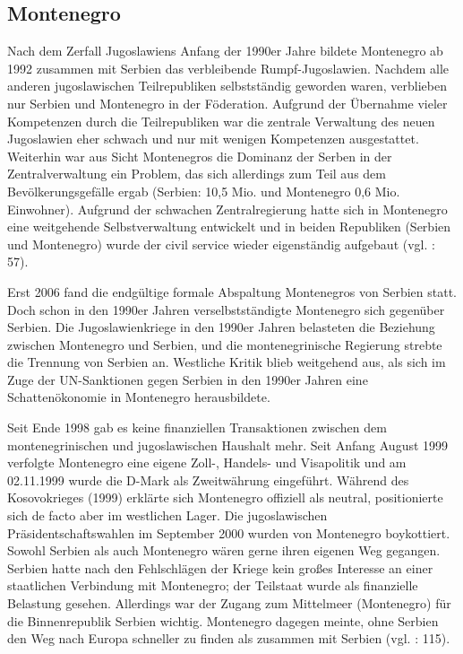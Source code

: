 \subsection{Montenegro}
Nach dem Zerfall Jugoslawiens Anfang der 1990er Jahre bildete Montenegro ab 1992 zusammen mit Serbien das verbleibende Rumpf-Jugoslawien. Nachdem alle anderen jugoslawischen Teilrepubliken selbstständig geworden waren, verblieben nur Serbien und Montenegro in der Föderation. Aufgrund der Übernahme vieler Kompetenzen durch die Teilrepubliken war die zentrale Verwaltung des neuen Jugoslawien eher schwach und nur mit wenigen Kompetenzen ausgestattet. Weiterhin war aus Sicht Montenegros die Dominanz der Serben in der Zentralverwaltung ein Problem, das sich allerdings zum Teil aus dem Bevölkerungsgefälle ergab (Serbien: 10,5 Mio. und Montenegro 0,6 Mio. Einwohner). Aufgrund der schwachen Zentralregierung hatte sich in Montenegro eine weitgehende Selbstverwaltung entwickelt und in beiden Republiken (Serbien und Montenegro) wurde der civil service wieder eigenständig aufgebaut (vgl. \cite{sevic}: 57).\par
Erst 2006 fand die endgültige formale Abspaltung Montenegros von Serbien statt. Doch schon in den 1990er Jahren verselbstständigte Montenegro sich gegenüber Serbien. Die Jugoslawienkriege in den 1990er Jahren belasteten die Beziehung zwischen Montenegro und Serbien, und die montenegrinische Regierung strebte die Trennung von Serbien an. Westliche Kritik blieb weitgehend aus, als sich im Zuge der UN-Sanktionen gegen Serbien in den 1990er Jahren eine Schattenökonomie in Montenegro herausbildete.\par
Seit Ende 1998 gab es keine finanziellen Transaktionen zwischen dem montenegrinischen und jugoslawischen Haushalt mehr. Seit Anfang August 1999 verfolgte Montenegro eine eigene Zoll-, Handels- und Visapolitik und am 02.11.1999 wurde die D-Mark als Zweitwährung eingeführt. Während des Kosovokrieges (1999) erklärte sich Montenegro offiziell als neutral, positionierte sich de facto aber im westlichen Lager. Die jugoslawischen Präsidentschaftswahlen im September 2000 wurden von Montenegro boykottiert. Sowohl Serbien als auch Montenegro wären gerne ihren eigenen Weg gegangen. Serbien hatte nach den Fehlschlägen der Kriege kein großes Interesse an einer staatlichen Verbindung mit Montenegro; der Teilstaat wurde als finanzielle Belastung gesehen. Allerdings war der Zugang zum Mittelmeer (Montenegro) für die Binnenrepublik Serbien wichtig. Montenegro dagegen meinte, ohne Serbien den Weg nach Europa schneller zu finden als zusammen mit Serbien (vgl. \cite{schmitz04}: 115).\par
